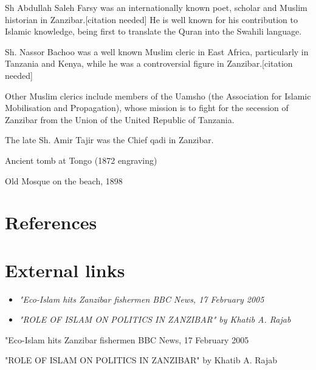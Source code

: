 Sh Abdullah Saleh Farsy was an internationally known poet, scholar and
Muslim historian in Zanzibar.{[}citation needed{]} He is well known for
his contribution to Islamic knowledge, being first to translate the
Quran into the Swahili language.

Sh. Nassor Bachoo was a well known Muslim cleric in East Africa,
particularly in Tanzania and Kenya, while he was a controversial figure
in Zanzibar.{[}citation needed{]}

Other Muslim clerics include members of the Uamsho (the Association for
Islamic Mobilisation and Propagation), whose mission is to fight for the
secession of Zanzibar from the Union of the United Republic of Tanzania.

The late Sh. Amir Tajir was the Chief qadi in Zanzibar.

Ancient tomb at Tongo (1872 engraving)

Old Mosque on the beach, 1898

\section{References}\label{references}

\section{External links}\label{external-links}

\begin{itemize}
\item
  \emph{"Eco-Islam hits Zanzibar fishermen BBC News, 17 February 2005}
\item
  \emph{"ROLE OF ISLAM ON POLITICS IN ZANZIBAR" by Khatib A. Rajab}
\end{itemize}

"Eco-Islam hits Zanzibar fishermen BBC News, 17 February 2005

"ROLE OF ISLAM ON POLITICS IN ZANZIBAR" by Khatib A. Rajab
